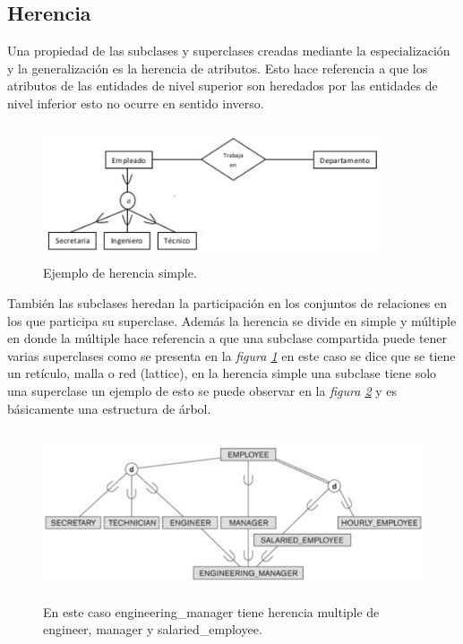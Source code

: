 \documentclass[12pt, titlepage]{article}
\begin{document}
    \subsection{Herencia}
    Una propiedad de las subclases y superclases creadas mediante la especialización y la generalización es la herencia de atributos. Esto hace referencia a que los atributos de las entidades de nivel superior son heredados por las entidades de nivel inferior esto no ocurre en sentido inverso.\cite{WEB}
    \begin{figure}[H]
        \begin{center}
            \includegraphics[width=10cm, height=4cm]{img/herencia1.png}
            \caption{Ejemplo de herencia simple.}
            \label{fig:ejemplo2}
        \end{center}
    \end{figure}
    También las subclases heredan la participación en los conjuntos de relaciones en los que participa su superclase. Además la herencia se divide en simple y múltiple en donde la múltiple hace referencia a que una subclase compartida puede tener varias superclases como se presenta en la \textit{figura \ref{fig:ejemplo2}} en este caso se dice que se tiene un retículo, malla o red (lattice), en la herencia simple una subclase tiene solo una superclase un ejemplo de esto se puede observar en la \textit{figura \ref{fig:ejemplo3}} y es básicamente una estructura de árbol.\cite{LIBRO1}
    \begin{figure}[H]
        \begin{center}
            \includegraphics[width=12cm, height=5cm]{img/herencia2.png}
            \caption{En este caso engineering\_manager tiene herencia multiple de engineer, manager y salaried\_employee.}
            \label{fig:ejemplo3}
        \end{center}
    \end{figure}
\end{document}
